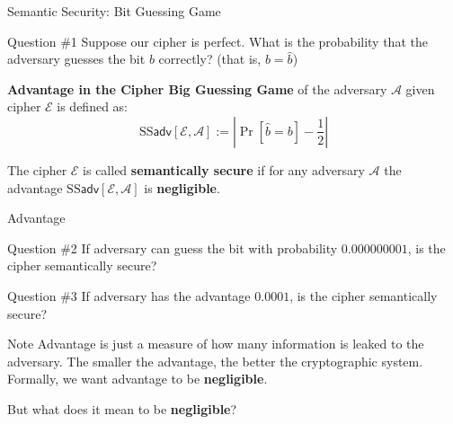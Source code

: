 \documentclass{beamer}
\begin{document}
    \begin{frame}{Semantic Security: Bit Guessing Game}

        \begin{alertblock}{Question \#1}
            Suppose our cipher is perfect. What is the probability that the adversary guesses the bit $b$ correctly? (that is, $b = \hat{b}$)\pause
        \end{alertblock}

        \begin{definition}
            \textbf{Advantage in the Cipher Big Guessing Game} of the adversary $\mathcal{A}$ given cipher $\mathcal{E}$ is defined as:
            \begin{equation*}
                \text{SS}\mathsf{adv}[\mathcal{E}, \mathcal{A}] := \left| \Pr[\hat{b} = b] - \frac{1}{2} \right|
            \end{equation*}
        \end{definition}

        \pause\begin{definition}
            The cipher $\mathcal{E}$ is called \textbf{semantically secure} if for any adversary $\mathcal{A}$ the advantage $\text{SS}\mathsf{adv}[\mathcal{E}, \mathcal{A}]$ is \textbf{negligible}.
        \end{definition}
    \end{frame}

    \begin{frame}{Advantage}
        \begin{alertblock}{Question \#2}
            If adversary can guess the bit with probability $0.000000001$, is the cipher semantically secure?\pause
        \end{alertblock}

        \begin{alertblock}{Question \#3}
            If adversary has the advantage $0.0001$, is the cipher semantically secure?\pause
        \end{alertblock}

        \begin{block}{Note}
            Advantage is just a measure of how many information is leaked to the adversary. The smaller the advantage, the better the cryptographic system. Formally, we want advantage to be \textbf{negligible}.\pause
        \end{block}

        But what does it mean to be \textbf{negligible}?
    
    \end{frame}
\end{document}
